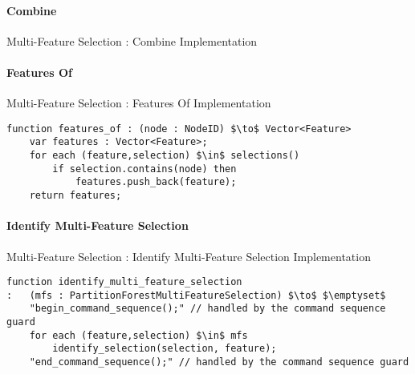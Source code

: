 \paragraph{Combine}

\begin{stulisting}[H]
\caption{Multi-Feature Selection : Combine Implementation}

\end{stulisting}

\paragraph{Features Of}

\begin{stulisting}[H]
\caption{Multi-Feature Selection : Features Of Implementation}
\begin{lstlisting}[style=Default]
function features_of : (node : NodeID) $\to$ Vector<Feature>
	var features : Vector<Feature>;
	for each (feature,selection) $\in$ selections()
		if selection.contains(node) then
			features.push_back(feature);
	return features;
\end{lstlisting}
\end{stulisting}

\paragraph{Identify Multi-Feature Selection}

\begin{stulisting}[H]
\caption{Multi-Feature Selection : Identify Multi-Feature Selection Implementation}
\begin{lstlisting}[style=Default]
function identify_multi_feature_selection
:	(mfs : PartitionForestMultiFeatureSelection) $\to$ $\emptyset$
	"begin_command_sequence();" // handled by the command sequence guard
	for each (feature,selection) $\in$ mfs
		identify_selection(selection, feature);
	"end_command_sequence();" // handled by the command sequence guard
\end{lstlisting}
\end{stulisting}

